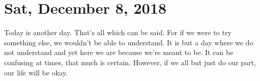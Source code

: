 \section{Sat, December 8, 2018}

Today is another day. That's all which can be said. For if we were to try something 
else, we wouldn't be able to understand. It is but a day where we do not understand
and yet here we are because we're meant to be. It can be confusing at times, that
much is certain. However, if we all but just do our part, our life will be okay.